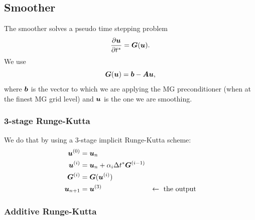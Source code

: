 \documentclass{article}
\newcommand{\todo}[1]{\textcolor{blue}{#1}}
\begin{document}
\subsection{Smoother}\label{sec:smoother}

The smoother solves a pseudo time stepping problem 
\begin{equation}\label{eq:smoother_pseudo_time_step}
    \dfrac{\partial\bm{u}}{\partial t^*} = \bm{G}(\bm{u})
    \text{.}
\end{equation}
We use
\begin{equation}
    \bm{G}(\bm{u}) = \bm{b} - \bm{A}\bm{u}
    \text{,}
\end{equation}
where $\bm{b}$ is the vector to which we are applying the MG preconditioner (when at the finest MG grid level) and $\bm{u}$ is the one we are smoothing.


\subsubsection{3-stage Runge-Kutta}

We do that by using a 3-stage implicit Runge-Kutta scheme:
\begin{subequations}
\begin{align}
    \bm{u}^{(0)}        &= \bm{u}_{n} \\
    \bm{u}^{(i)}        &= \bm{u}_{n} + \alpha_i\Delta t^*\bm{G}^{(i-1)}
            \label{eq:smoother_with_precond} \\
    \bm{G}^{(i)}  &= \bm{G}(\bm{u}^{(i)}) \\
    \bm{u}_{n+1}        &= \bm{u}^{(3)} & \leftarrow \text{ the output}
\end{align}
\end{subequations}



\subsubsection{Additive Runge-Kutta}
\end{document}

